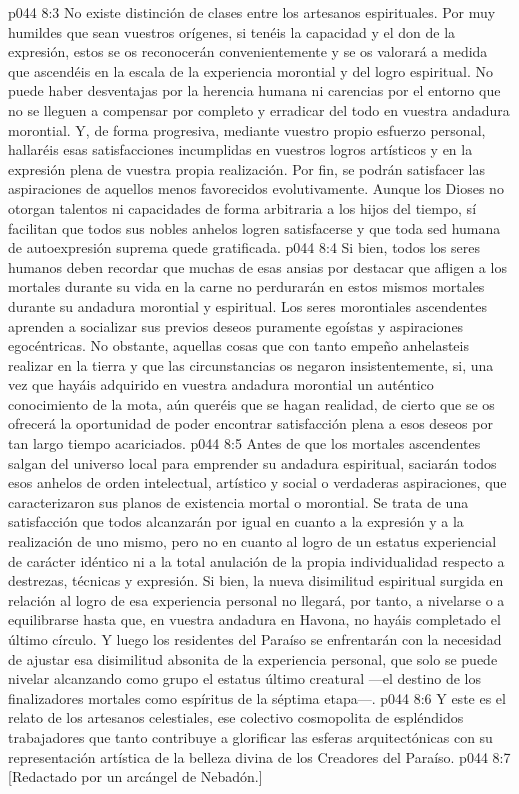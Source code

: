 \vs p044 8:3 \pc No existe distinción de clases entre los artesanos espirituales. Por muy humildes que sean vuestros orígenes, si tenéis la capacidad y el don de la expresión, estos se os reconocerán convenientemente y se os valorará a medida que ascendéis en la escala de la experiencia morontial y del logro espiritual. No puede haber desventajas por la herencia humana ni carencias por el entorno que no se lleguen a compensar por completo y erradicar del todo en vuestra andadura morontial. Y, de forma progresiva, mediante vuestro propio esfuerzo personal, hallaréis esas satisfacciones incumplidas en vuestros logros artísticos y en la expresión plena de vuestra propia realización. Por fin, se podrán satisfacer las aspiraciones de aquellos menos favorecidos evolutivamente. Aunque los Dioses no otorgan talentos ni capacidades de forma arbitraria a los hijos del tiempo, sí facilitan que todos sus nobles anhelos logren satisfacerse y que toda sed humana de autoexpresión suprema quede gratificada.
\vs p044 8:4 Si bien, todos los seres humanos deben recordar que muchas de esas ansias por destacar que afligen a los mortales durante su vida en la carne no perdurarán en estos mismos mortales durante su andadura morontial y espiritual. Los seres morontiales ascendentes aprenden a socializar sus previos deseos puramente egoístas y aspiraciones egocéntricas. No obstante, aquellas cosas que con tanto empeño anhelasteis realizar en la tierra y que las circunstancias os negaron insistentemente, si, una vez que hayáis adquirido en vuestra andadura morontial un auténtico conocimiento de la mota, aún queréis que se hagan realidad, de cierto que se os ofrecerá la oportunidad de poder encontrar satisfacción plena a esos deseos por tan largo tiempo acariciados.
\vs p044 8:5 Antes de que los mortales ascendentes salgan del universo local para emprender su andadura espiritual, saciarán todos esos anhelos de orden intelectual, artístico y social o verdaderas aspiraciones, que caracterizaron sus planos de existencia mortal o morontial. Se trata de una satisfacción que todos alcanzarán por igual en cuanto a la expresión y a la realización de uno mismo, pero no en cuanto al logro de un estatus experiencial de carácter idéntico ni a la total anulación de la propia individualidad respecto a destrezas, técnicas y expresión. Si bien, la nueva disimilitud espiritual surgida en relación al logro de esa experiencia personal no llegará, por tanto, a nivelarse o a equilibrarse hasta que, en vuestra andadura en Havona, no hayáis completado el último círculo. Y luego los residentes del Paraíso se enfrentarán con la necesidad de ajustar esa disimilitud absonita de la experiencia personal, que solo se puede nivelar alcanzando como grupo el estatus último creatural ---el destino de los finalizadores mortales como espíritus de la séptima etapa---.
\vs p044 8:6 \pc Y este es el relato de los artesanos celestiales, ese colectivo cosmopolita de espléndidos trabajadores que tanto contribuye a glorificar las esferas arquitectónicas con su representación artística de la belleza divina de los Creadores del Paraíso.
\vsetoff
\vs p044 8:7 [Redactado por un arcángel de Nebadón.]
